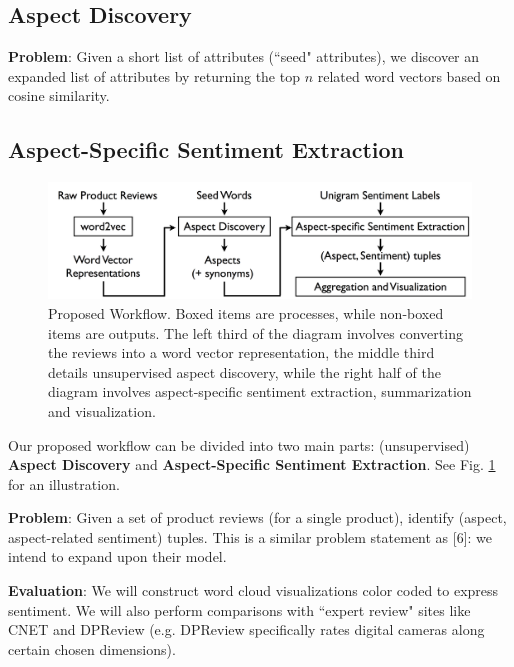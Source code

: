 \documentclass{article} %
\begin{document}
\subsection{Aspect Discovery}

\textbf{Problem}: Given a short list of attributes (``seed" attributes), we discover an expanded list of attributes by returning the top $n$ related word vectors based on cosine similarity.



\subsection{Aspect-Specific Sentiment Extraction}



\begin{figure}[ht]
\begin{center}
\includegraphics[width=.85\columnwidth]{workflow.png}
\end{center}
\caption{Proposed Workflow. Boxed items are processes, while non-boxed items are outputs. The left third of the diagram involves converting the reviews into a word vector representation, the middle third details unsupervised aspect discovery, while the right half of the diagram involves aspect-specific sentiment extraction, summarization and visualization.}%
\label{workflow}
\end{figure}

Our proposed workflow can be divided into two main parts: (unsupervised) {\bf Aspect Discovery} and {\bf Aspect-Specific Sentiment Extraction}. See Fig. \ref{workflow} for an illustration.

\textbf{Problem}: Given a set of product reviews (for a single product), identify (aspect, aspect-related sentiment) tuples. This is a similar problem statement as [6]: we intend to expand upon their model.

\textbf{Evaluation}: We will construct word cloud visualizations color coded to express sentiment. We will also perform comparisons with ``expert review" sites like CNET and DPReview (e.g. DPReview specifically rates digital cameras along certain chosen dimensions).
\end{document}
